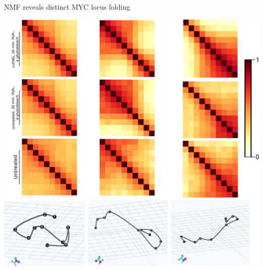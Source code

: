 \documentclass[landscape,a0paper,fontscale=0.285]{baposter} %
\begin{document}
\begin{poster}

\begin{posterbox}[name=section06, column=2, height=0.5]{NMF reveals distinct MYC locus folding}
\begin{center}
\includegraphics[width=1\linewidth, height=250\lineheight]{bestMethod_nmf_withViews.pdf}
\end{center}
\end{posterbox}



\end{poster}
\end{document}
